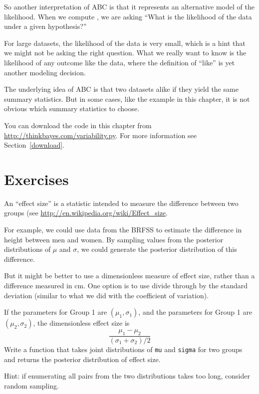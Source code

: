 \documentclass[12pt]{book}
\begin{document}
So another interpretation of ABC is that it represents an alternative
model of the likelihood.  When we compute , we are asking
``What is the likelihood of the data under a given hypothesis?''

For large datasets, the likelihood of the data is very small, which
is a hint that we might not be asking the right question.  What
we really want to know is the likelihood of any outcome
like the data, where the definition of ``like'' is yet another
modeling decision.

The underlying idea of ABC is that two datasets alike if they yield
the same summary statistics.  But in some cases, like the example in
this chapter, it is not obvious which summary statistics to choose.

You can download the code in this chapter from
\url{http://thinkbayes.com/variability.py}.
  For more information
see Section~\ref{download}.

\section{Exercises}

\begin{exercise}

An ``effect size'' is a statistic intended to measure the difference
between two groups (see
\url{http://en.wikipedia.org/wiki/Effect_size}.

For example, we could use data from the BRFSS to estimate the
difference in height between men and women.  By sampling values
from the posterior distributions of $\mu$ and
$\sigma$, we could generate the posterior distribution of this
difference.

But it might be better to use a dimensionless measure of effect
size, rather than a difference measured in cm.  One option is
to use divide through by the standard deviation (similar to what
we did with the coefficient of variation).

If the parameters for Group 1 are $(\mu_1, \sigma_1)$, and the
parameters for Group 1 are $(\mu_2, \sigma_2)$, the dimensionless
effect size is
%
\[ \frac{\mu_1 - \mu_2}{(\sigma_1 + \sigma_2)/2} \]
%
Write a function that takes joint distributions of
{\tt mu} and {\tt sigma} for two groups and returns
the posterior distribution of effect size.

Hint: if enumerating all pairs from the two distributions takes too
long, consider random sampling.

\end{exercise}
\end{document}
